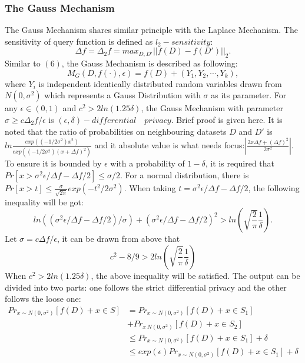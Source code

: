 \documentclass[conference]{IEEEtran}
\begin{document}
\subsubsection{The Gauss Mechanism}
The Gauss Mechanism shares similar principle with the Laplace Mechanism. The sensitivity of query function is defined as $l_2-sensitivity$:
\begin{equation}
    \Delta f = \Delta_2 f = max_{D, D'}||f(D)-f(D')||_2.
\end{equation}
Similar to $(6)$, the Gauss Mechanism is described as following:
\begin{equation}
    M_G(D, f(\cdot), \epsilon) = f(D) +(Y_1, Y_2, \cdots, Y_k),
\end{equation}
where $Y_i$ is independent identically distributed random variables drawn from $N(0,\sigma^2)$ which represents a Gauss Distribution with $\sigma$ as its parameter. For any $\epsilon \in (0,1)$ and $c^2 > 2ln(1.25\delta)$, the Gauss Mechanism with parameter $\sigma \geq c\Delta_2 f / \epsilon$ is $(\epsilon, \delta)-differential \quad privacy$. Brief proof is given here. It is noted that the ratio of probabilities on neighbouring datasets $D$ and $D'$ is $ln\frac{exp((-1/2\sigma^2)x^2)}{exp((-1/2\sigma^2)(x+\Delta f)^2)}$ and it absolute value is what needs focus:$|\frac{2x\Delta f +(\Delta f)^2}{2\sigma^2}|$. To ensure it is bounded by $\epsilon$ with a probability of $1-\delta$, it is required that $Pr[x>\sigma^2\epsilon / \Delta f - \Delta f / 2]\leq \sigma / 2$. For a normal distribution, there is $Pr[x>t]\leq \frac{\sigma}{\sqrt{2\pi}}exp(-t^2/2\sigma^2)$. When taking $t=\sigma^2\epsilon / \Delta f - \Delta f / 2$, the following inequality will be got:
\begin{equation}
    ln((\sigma^2\epsilon / \Delta f - \Delta f / 2)/ \sigma)+(\sigma^2\epsilon / \Delta f - \Delta f / 2)^2 >ln(\sqrt{\frac{2}{\pi}}\frac{1}{\delta}).
\end{equation}
Let $\sigma=c\Delta f/\epsilon$, it can be drawn from above that
\begin{equation}
    c^2-8/9 > 2ln(\sqrt{\frac{2}{\pi}}\frac{1}{\delta})
\end{equation}
When $c^2 > 2ln(1.25\delta)$, the above inequality will be satisfied. The output can be divided into two parts: one follows the strict differential privacy and the other follows the loose one:
\begin{equation}
    \begin{split}
        Pr_{x \sim N(0, \sigma^2)}[f(D)+x \in S] &= Pr_{x \sim N(0, \sigma^2)}[f(D)+x \in S_1]\\ 
        &+ Pr_{x~N(0, \sigma^2)}[f(D)+x \in S_2]\\
        & \leq Pr_{x \sim N(0, \sigma^2)}[f(D)+x \in S_1] +\delta\\
        & \leq exp(\epsilon) Pr_{x \sim N(0, \sigma^2)}[f(D)+x \in S_1] +\delta
    \end{split}
\end{equation}
\end{document}
